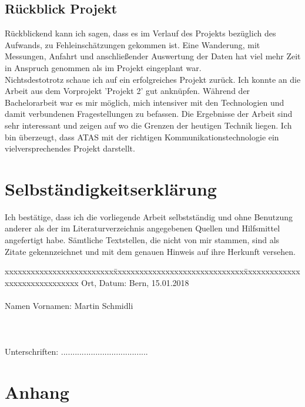 \documentclass[11pt,english,german]{report}
\theoremstyle{definition}
\begin{document}
\section{Rückblick Projekt}
Rückblickend kann ich sagen, dass es im Verlauf des Projekts bezüglich des Aufwands, zu Fehleinschätzungen gekommen ist. Eine Wanderung, mit Messungen, Anfahrt und anschließender Auswertung der Daten hat viel mehr Zeit in Anspruch genommen als im Projekt eingeplant war.\\[0.3cm]
Nichtsdestotrotz schaue ich auf ein erfolgreiches Projekt zurück. Ich konnte an die Arbeit aus dem Vorprojekt 'Projekt 2' gut anknüpfen. Während der Bachelorarbeit war es mir möglich, mich intensiver mit den Technologien und damit verbundenen Fragestellungen zu befassen. Die Ergebnisse der Arbeit sind sehr interessant und zeigen auf wo die Grenzen der heutigen Technik liegen. Ich bin überzeugt, dass ATAS mit der richtigen Kommunikationstechnologie ein vielversprechendes Projekt darstellt.

\chapter*{Selbständigkeitserklärung}
\label{chap:selbstaendigkeitserklaerung}

\vspace*{10mm} 

Ich bestätige, dass ich die vorliegende Arbeit selbstständig und ohne Benutzung anderer als der im Literaturverzeichnis angegebenen Quellen und Hilfsmittel angefertigt habe. Sämtliche Textstellen, die nicht von mir stammen, sind als Zitate gekennzeichnet und mit dem genauen Hinweis auf ihre Herkunft versehen. 

\vspace{15mm}

\begin{tabbing}
xxxxxxxxxxxxxxxxxxxxxxxxx\=xxxxxxxxxxxxxxxxxxxxxxxxxxxxxx\=xxxxxxxxxxxxxxxxxxxxxxxxxxxxxx\kill
Ort, Datum:\> Bern, 15.01.2018 \\ \\
Namen Vornamen:\> Martin Schmidli  \\ \\ \\ \\ 
Unterschriften:\> ...................................... \\
\end{tabbing}

\chapter*{Anhang}
\end{document}
